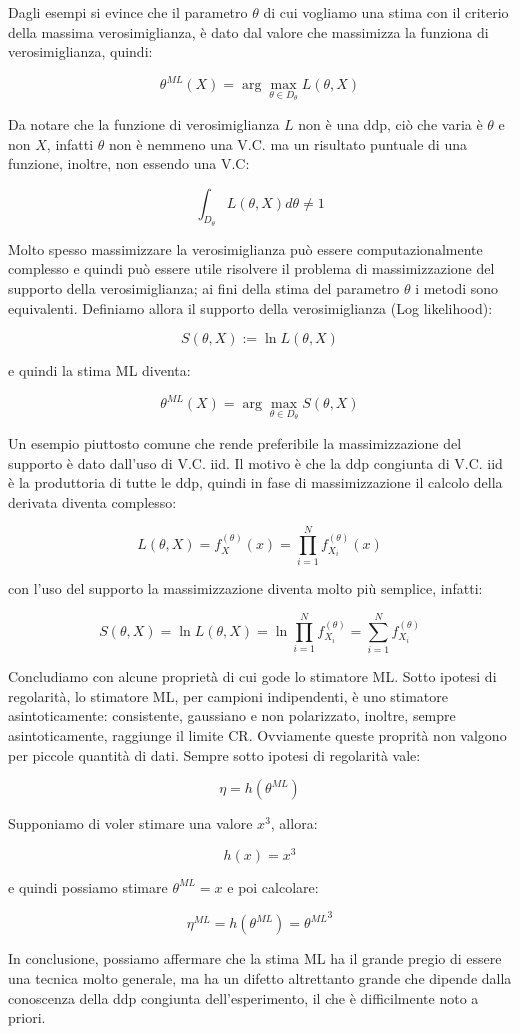 Dagli esempi si evince che il parametro $\theta$ di cui vogliamo una stima con il criterio della massima verosimiglianza, è dato dal valore che massimizza la funziona di verosimiglianza, quindi:

    \[ \theta^{ML}(X)=\arg \max_{\theta \in D_\theta} L(\theta,X) \]

Da notare che la funzione di verosimiglianza $L$ non è una ddp, ciò che varia è $\theta$ e non $X$, infatti $\theta$ non è nemmeno una V.C. ma un risultato puntuale di una funzione, inoltre, non essendo una V.C:

  \[ \int_{D_\theta}^{}L(\theta,X) d\theta\ne 1 \]
  
Molto spesso massimizzare la verosimiglianza può essere computazionalmente complesso e quindi può essere utile risolvere il problema di massimizzazione del supporto della verosimiglianza; ai fini della stima del parametro $\theta$ i metodi sono equivalenti. Definiamo allora il supporto della verosimiglianza (Log likelihood):

  \[ S(\theta,X):= \ln L(\theta,X)  \]
  
e quindi la stima ML diventa:

  \[ \theta^{ML}(X)=\arg \max_{\theta \in D_\theta} S(\theta,X)  \]
  
Un esempio piuttosto comune che rende preferibile la massimizzazione del supporto è dato dall'uso di V.C. iid. Il motivo è che la ddp congiunta di V.C. iid è la produttoria di tutte le ddp, quindi in fase di massimizzazione il calcolo della derivata diventa complesso:

  \[ L(\theta,X)=f_X^{(\theta)}(x)=\prod_{i=1}^{N}  f_{X_i}^{(\theta)}(x)  \]
  
con l'uso del supporto la massimizzazione diventa molto più semplice, infatti:

  \[ S(\theta,X)= \ln L(\theta,X )= \ln \prod_{i=1}^{N}  f_{X_i}^{(\theta)}  =  \sum_{i=1}^{N}   f_{X_i}^{(\theta)} \]
  
Concludiamo con alcune proprietà di cui gode lo stimatore ML. Sotto ipotesi di regolarità, lo stimatore ML, per campioni indipendenti, è uno stimatore asintoticamente: consistente, gaussiano e non polarizzato, inoltre, sempre asintoticamente, raggiunge il limite CR. Ovviamente queste proprità non valgono per piccole quantità di dati.
Sempre sotto ipotesi di regolarità vale:

  \[ \eta = h(\theta^{ML}) \]

\begin{esempio}  
Supponiamo di voler stimare una valore $x^3$, allora:

  \[ h(x)=x^3 \]
  
e quindi possiamo stimare $\theta^{ML} = x$ e poi calcolare:

  \[ \eta^{ML} = h(\theta^{ML})={\theta^{ML}}^3 \]
\end{esempio}

In conclusione, possiamo affermare che la stima ML ha il grande pregio di essere una tecnica molto generale, ma ha un difetto altrettanto grande che dipende dalla conoscenza della ddp congiunta dell'esperimento, il che è difficilmente noto a priori.
